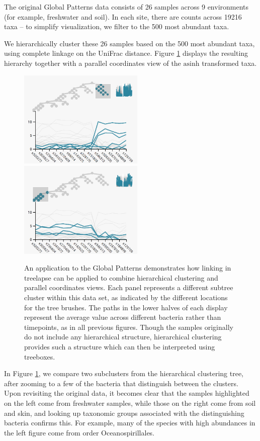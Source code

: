 \documentclass[12pt]{article}
\begin{document}
The original Global Patterns data consists of 26 samples across 9
environments (for example, freshwater and soil). In each site, there are
counts across 19216 taxa -- to simplify visualization, we filter to the
500 most abundant taxa.

We hierarchically cluster these 26 samples based on the 500 most
abundant taxa, using complete linkage on the UniFrac distance. Figure
\ref{fig:gptimebox} displays the resulting hierarchy together with a
parallel coordinates view of the \(\text{asinh}\) transformed taxa.

\begin{figure}
  {
    \centering
    \includegraphics[width=225px]{figure/gp_cluster1}
    \includegraphics[width=225px]{figure/gp_cluster2}
}

\caption{An application to the Global Patterns demonstrates how linking in
  treelapse can be applied to combine hierarchical clustering and parallel
  coordinates views. Each panel represents a different subtree cluster within
  this data set, as indicated by the different locations for the tree brushes.
  The paths in the lower halves of each display represent the average value
  across different bacteria rather than timepoints, as in all previous figures.
  Though the samples originally do not include any hierarchical structure,
  hierarchical clustering provides such a structure which can then be
  interpreted using treeboxes. }\label{fig:gptimebox}
\end{figure}

In Figure \ref{fig:gptimebox}, we compare two subclusters from the
hierarchical clustering tree, after zooming to a few of the bacteria
that distinguish between the clusters. Upon revisiting the original
data, it becomes clear that the samples highlighted on the left come
from freshwater samples, while those on the right come from soil and
skin, and looking up taxonomic groups associated with the distinguishing
bacteria confirms this. For example, many of the species with high
abundances in the left figure come from order Oceanospirillales.
\end{document}
